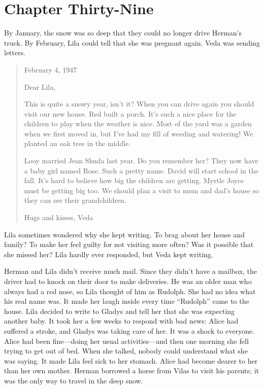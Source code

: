 \documentclass[
  letterpaper,
]{book}
\begin{document}

\chapter{Chapter Thirty-Nine}\label{chapter-thirty-nine}

By January, the snow was so deep that they could no longer drive
Herman's truck. By February, Lila could tell that she was pregnant
again. Veda was sending letters.

\begin{quote}
February 4, 1947

Dear Lila,

This is quite a snowy year, isn't it? When you can drive again you
should visit our new house. Red built a porch. It's such a nice place
for the children to play when the weather is nice. Most of the yard was
a garden when we first moved in, but I've had my fill of weeding and
watering! We planted an oak tree in the middle.

Looy married Jean Shuda last year. Do you remember her? They now have a
baby girl named Rose. Such a pretty name. David will start school in the
fall. It's hard to believe how big the children are getting. Myrtle
Joyce must be getting big too. We should plan a visit to mom and dad's
house so they can see their grandchildren.

Hugs and kisses, Veda
\end{quote}

Lila sometimes wondered why she kept writing. To brag about her house
and family? To make her feel guilty for not visiting more often? Was it
possible that she missed her? Lila hardly ever responded, but Veda kept
writing.

Herman and Lila didn't receive much mail. Since they didn't have a
mailbox, the driver had to knock on their door to make deliveries. He
was an older man who always had a red nose, so Lila thought of him as
Rudolph. She had no idea what his real name was. It made her laugh
inside every time ``Rudolph'' came to the house. Lila decided to write
to Gladys and tell her that she was expecting another baby. It took her
a few weeks to respond with bad news: Alice had suffered a stroke, and
Gladys was taking care of her. It was a shock to everyone. Alice had
been fine---doing her usual activities---and then one morning she fell
trying to get out of bed. When she talked, nobody could understand what
she was saying. It made Lila feel sick to her stomach. Alice had become
dearer to her than her own mother. Herman borrowed a horse from Vilas to
visit his parents; it was the only way to travel in the deep snow.
\end{document}
